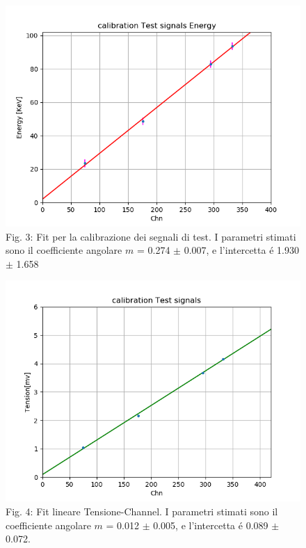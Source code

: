 \documentclass[a4paper]{article}
\begin{document}
\begin{figure}[H]
\includegraphics[width=1\textwidth]{calibration_test_signals_energy}
        \caption{Fig. 3: Fit per la calibrazione dei segnali di test. I parametri stimati sono il coefficiente angolare $m$ = 0.274 $\pm$ 0.007, e l'intercetta \'e 1.930 $\pm$ 1.658}
        \label{fig:3}
\end{figure}

\begin{figure}[H]
\includegraphics[width=1\textwidth]{calibration_test_signals}
        \caption{Fig. 4: Fit lineare Tensione-Channel. I parametri stimati sono il coefficiente angolare $m$ = 0.012 $\pm$ 0.005, e l'intercetta \'e 0.089 $\pm$ 0.072.}
        \label{fig:4}
\end{figure}
\end{document}
